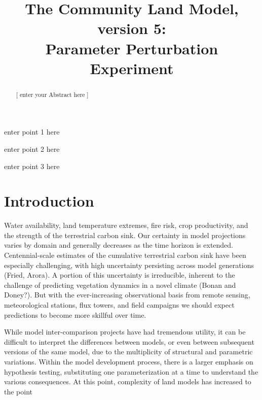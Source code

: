 \documentclass[draft]{agujournal2019}
\begin{document}
\title{The Community Land Model, version 5: \\ Parameter Perturbation Experiment}













\begin{keypoints}
\item enter point 1 here
\item enter point 2 here
\item enter point 3 here
\end{keypoints}



\begin{abstract}
[ enter your Abstract here ]
\end{abstract}







\section{Introduction}

Water availability, land temperature extremes, fire risk, crop productivity, and the strength of the terrestrial carbon sink.
Our certainty in model projections varies by domain and generally decreases as the time horizon is extended.
Centennial-scale estimates of the cumulative terrestrial carbon sink have been especially challenging, with high uncertainty persisting across model generations (Fried, Arora). 
A portion of this uncertainty is irreducible, inherent to the challenge of predicting vegetation dynamics in a novel climate (Bonan and Doney?).
But with the ever-increasing observational basis from remote sensing, meteorological stations, flux towers, and field campaigns we should expect predictions to become more skillful over time.

While model inter-comparison projects have had tremendous utility, it can be difficult to interpret the differences between models, or even between subsequent versions of the same model, due to the multiplicity of structural and parametric variations.
Within the model development process, there is a larger emphasis on hypothesis testing, substituting one parameterization at a time to understand the various consequences.
At this point, complexity of land models has increased to the point 
\end{document}
